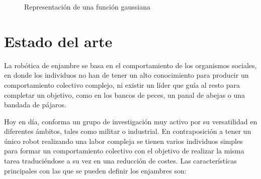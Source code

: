 \begin{figure}[htb]
  \begin{center}
    \caption{Representación de una función gaussiana}
    \label{FunGauss}
  \end{center}
\end{figure}

\section{Estado del arte}\label{Objetives}

La robótica de enjambre se basa en el comportamiento de los organismos sociales, en donde los individuos no han de tener un alto conocimiento para producir un comportamiento colectivo complejo, ni existir un líder que guía al resto para completar un objetivo, como en los bancos de peces, un panal de abejas o una bandada de pájaros.

Hoy en día, conforma un grupo de investigación muy activo por su versatilidad en diferentes ámbitos, tales como militar o industrial. En contraposición a tener un único robot realizando una labor compleja se tienen varios individuos simples para formar un comportamiento colectivo con el objetivo de realizar la misma tarea traduciéndose a su vez en una reducción de costes. Las características principales con las que se pueden definir los enjambres son:

